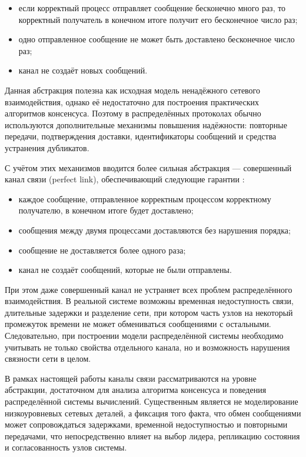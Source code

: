 \begin{itemize}
    \item если корректный процесс отправляет сообщение бесконечно много раз, то
корректный получатель в конечном итоге получит его бесконечное число раз;
    \item одно отправленное сообщение не может быть доставлено бесконечное
число раз;
    \item канал не создаёт новых сообщений.
\end{itemize}

Данная абстракция полезна как исходная модель ненадёжного сетевого
взаимодействия, однако её недостаточно для построения практических алгоритмов
консенсуса. Поэтому в распределённых протоколах обычно используются
дополнительные механизмы повышения надёжности: повторные передачи,
подтверждения доставки, идентификаторы сообщений и средства устранения
дубликатов.

С учётом этих механизмов вводится более сильная абстракция --- совершенный
канал связи (perfect link), обеспечивающий следующие гарантии \cite{cachin11}:

\begin{itemize}
    \item каждое сообщение, отправленное корректным процессом корректному
получателю, в конечном итоге будет доставлено;
    \item сообщения между двумя процессами доставляются без нарушения порядка;
    \item сообщение не доставляется более одного раза;
    \item канал не создаёт сообщений, которые не были отправлены.
\end{itemize}

При этом даже совершенный канал не устраняет всех проблем распределённого
взаимодействия. В реальной системе возможны временная недоступность связи,
длительные задержки и разделение сети, при котором часть узлов на некоторый
промежуток времени не может обмениваться сообщениями с остальными.
Следовательно, при построении модели распределённой системы необходимо
учитывать не только свойства отдельного канала, но и возможность нарушения
связности сети в целом.

В рамках настоящей работы каналы связи рассматриваются на уровне абстракции,
достаточном для анализа алгоритма консенсуса и поведения распределённой системы
вычислений. Существенным является не моделирование низкоуровневых сетевых
деталей, а фиксация того факта, что обмен сообщениями может сопровождаться
задержками, временной недоступностью и повторными передачами, что
непосредственно влияет на выбор лидера, репликацию состояния и согласованность
узлов системы.

